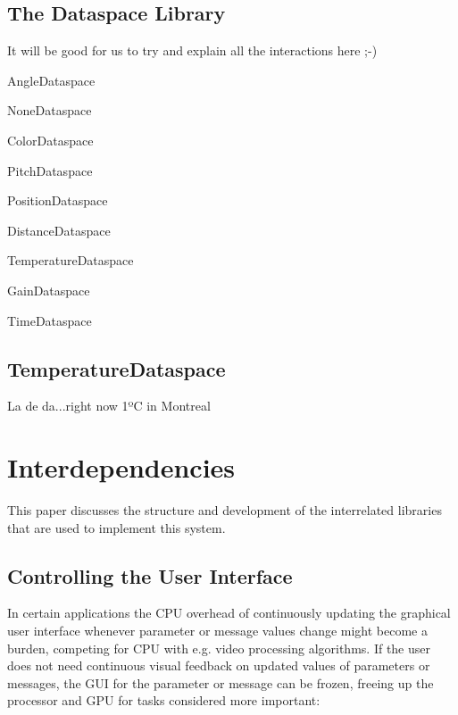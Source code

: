 \documentclass{article}
\newenvironment{packed_item}{
\begin{itemize}
  \setlength{\itemsep}{1pt}
  \setlength{\parskip}{0pt}
  \setlength{\parsep}{0pt}
}{\end{itemize}}
\begin{document}
\subsection{The Dataspace Library}\label{sec:dataspacelib}

It will be good for us to try and explain all the interactions here ;-) 
\begin{packed_item}
	\item AngleDataspace
	\item NoneDataspace
	\item ColorDataspace
	\item PitchDataspace
	\item PositionDataspace
	\item DistanceDataspace
    \item TemperatureDataspace
    \item GainDataspace
	\item TimeDataspace
\end{packed_item}
	


\subsection{TemperatureDataspace}\label{subsec:temperature_dataspace}

La de da...right now 1ºC in Montreal %



\section{Interdependencies}\label{sec:interdependencies}

This paper discusses the structure and development of the interrelated libraries that are used to implement this system.



\subsection{Controlling the User Interface} %
\label{sub:controlling_the_user_interface}

In certain applications the CPU overhead of continuously updating the graphical user interface whenever parameter or message values change might become a burden, competing for CPU with e.g. video processing algorithms. If the user does not need continuous visual feedback on updated values of parameters or messages, the GUI for the parameter or message can be frozen, freeing up the processor and GPU for tasks considered more important:
\end{document}
